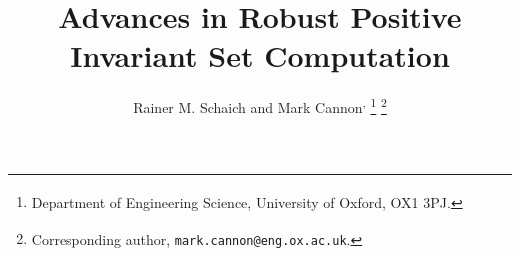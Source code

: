 \documentclass[letterpaper, 10pt, conference]{ieeeconf} %
\begin{document}
  \title{Advances in Robust Positive Invariant Set Computation}

\author{Rainer M. Schaich\textsuperscript{\dag} %
         and Mark Cannon\textsuperscript{\dag,\ddag}%
\thanks{\textsuperscript{\dag} Department of Engineering Science, University of Oxford, OX1 3PJ.}%
\thanks{\textsuperscript{\ddag} Corresponding author, 
        \texttt{mark.cannon@eng.ox.ac.uk}.}
}


\maketitle

\begin{abstract} 

\end{abstract}

\begin{keywords}
\vskip-\baselineskip
\end{keywords}
\end{document}
